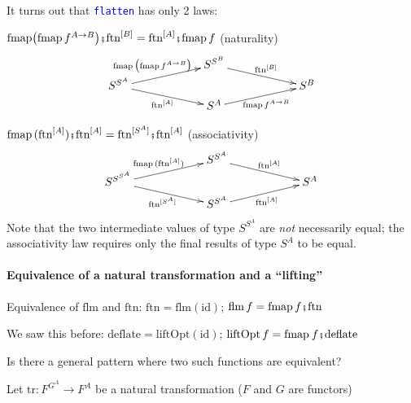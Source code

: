 It turns out that \texttt{\textcolor{blue}{\footnotesize{}flatten}}
has only 2 laws:

{\footnotesize{}$\text{fmap}\big(\text{fmap}\,f^{A\rightarrow B}\big)\bef\text{ftn}^{\left[B\right]}=\text{ftn}^{\left[A\right]}\bef\text{fmap}\,f$}
{\footnotesize{}(naturality)
\[
\xymatrix{\xyScaleY{0.2pc}\xyScaleX{5pc} & S^{S^{B}}\ar[rd]\sp(0.5){\ \text{ftn}^{\left[B\right]}}\\
S^{S^{A}}\ar[ru]\sp(0.5){\text{fmap}\,\big(\text{fmap}\,f^{A\rightarrow B}\big)\ \ }\ar[rd]\sb(0.5){\text{ftn}^{\left[A\right]}\,} &  & S^{B}\\
 & S^{A}\ar[ru]\sb(0.5){\text{fmap}\,f^{A\rightarrow B}}
}
\]
}{\footnotesize\par}

{\footnotesize{}$\text{fmap}\,(\text{ftn}^{\left[A\right]})\bef\text{ftn}^{\left[A\right]}=\text{ftn}^{[S^{A}]}\bef\text{ftn}^{\left[A\right]}$}
{\footnotesize{}(associativity) 
\[
\xymatrix{\xyScaleY{0.2pc}\xyScaleX{5pc} & S^{S^{A}}\ar[rd]\sp(0.5){\ \text{ftn}^{\left[A\right]}}\\
S^{S^{S^{A}}}\ar[ru]\sp(0.5){\text{fmap}\,(\text{ftn}^{\left[A\right]})\ }\ar[rd]\sb(0.5){\text{ftn}^{[S^{A}]}\,} &  & S^{A}\\
 & S^{S^{A}}\ar[ru]\sb(0.5){\text{ftn}^{\left[A\right]}}
}
\]
Note that the two intermediate values of type $S^{S^{A}}$ are }\emph{\footnotesize{}not}{\footnotesize{}
necessarily equal; the associativity law requires only the final results
of type $S^{A}$ to be equal.}{\footnotesize\par}


\paragraph{Equivalence of a natural transformation and a ``lifting''}

Equivalence of {\footnotesize{}$\text{flm}$} and {\footnotesize{}$\text{ftn}$}:
{\footnotesize{}$\text{ftn}=\text{flm}\left(\text{id}\right)$; $\text{flm}\,f=\text{fmap}\,f\bef\text{ftn}$} 

We saw this before: {\footnotesize{}$\text{deflate}=\text{liftOpt}\left(\text{id}\right)$};
{\footnotesize{}$\text{liftOpt}\,f=\text{fmap}\:f\bef\text{deflate}$} 

Is there a general pattern where two such functions are equivalent?

Let {\footnotesize{}$\text{tr}:F^{G^{A}}\rightarrow F^{A}$ }be a
natural transformation ($F$ and $G$ are functors)

